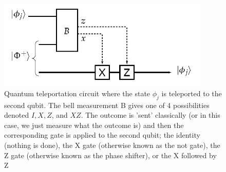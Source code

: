 \begin{figure}[h]
    \centering
    \includegraphics[width=0.9\textwidth]{images/QT circuit.png}
    \caption{Quantum teleportation circuit where the state $\phi_j$ is teleported to the second qubit. The bell measurement B gives one of 4 possibilities denoted $I, X, Z$, and $XZ$. The outcome is 'sent' classically (or in this case, we just measure what the outcome is) and then the corresponding gate is applied to the second qubit; the identity (nothing is done), the X gate (otherwise known as the not gate), the Z gate (otherwise known as the phase shifter), or the X followed by Z}\label{fig:QT circuit}
\end{figure}

